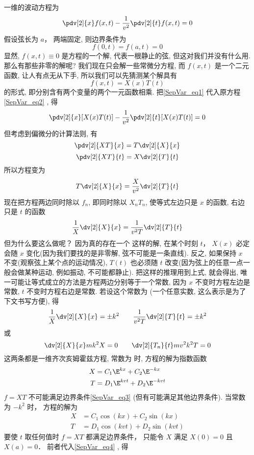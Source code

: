 一维的波动方程为
\begin{equation}
\pdv[2]{x} f(x, t) - \frac{1}{v^2} \pdv[2]{t}f(x, t) = 0
\end{equation}
假设弦长为 $a$， 两端固定, 则边界条件为
\begin{equation}\label{SepVar_eq3}
f(0, t) = f(a, t) = 0
\end{equation}
显然, $f(x, t) \equiv 0$ 是方程的一个解, 代表一根静止的弦, 但这对我们并没有什么用. 那么有那些非零的解呢? 我们现在只会解一些常微分方程, 而 $f(x, t)$ 是一个二元函数, 让人有点无从下手, 所以我们可以先猜测某个解具有
\begin{equation}\label{SepVar_eq1}
f(x, t) = X(x) T(t)
\end{equation}
的形式, 即分别含有两个变量的两个一元函数相乘. 把\autoref{SepVar_eq1} 代入原方程\autoref{SepVar_eq2} , 得
\begin{equation}
\pdv[2]{x}[X(x)T(t)] - \frac{1}{v^2}\pdv[2]{t} [X(x) T(t)] = 0
\end{equation}
但考虑到偏微分的计算法则, 有
\begin{equation}
\pdv[2]{XT}{x} = T \dv[2]{X}{x}
\end{equation}
\begin{equation}
\pdv[2]{XT}{t} = X \dv[2]{T}{t}
\end{equation}
所以方程变为
\begin{equation}
T\dv[2]{X}{x} = \frac{X}{v^2} \dv[2]{T}{t}
\end{equation}
现在把方程两边同时除以 $f_n$, 即同时除以 $X_n T_n$, 使等式左边只是 $x$ 的函数, 右边只是 $t$ 的函数
\begin{equation}
\frac{1}{X}\dv[2]{X}{x} = \frac{1}{v^2 T} \dv[2]{T}{t}
\end{equation}
但为什么要这么做呢？ 因为真的存在一个 这样的解, 在某个时刻 $t$， $X(x)$ 必定会随 $x$ 变化(因为我们要找的是非零解, 弦不可能是一条直线). 反之, 如果保持 $x$ 不变(观察弦上某个点的运动情况), $T(t)$ 也必须随 $t$ 改变(因为弦上的任意一点一般会做某种运动, 例如振动, 不可能都静止). 把这样的推理用到上式, 就会得出, 唯一可能让等式成立的方法是方程两边分别等于一个常数, 因为 $x$ 不变时方程左边是常数,  $t$ 不变时方程右边是常数. 若设这个常数为 (一个任意实数, 这么表示是为了下文书写方便), 得
\begin{equation}
\frac{1}{X}\dv[2]{X}{x} = \pm k^2
\qquad
\frac{1}{v^2 T}\dv[2]{T}{t} = \pm k^2
\end{equation}
或
\begin{equation}
\dv[2]{X}{x} mk^2 X = 0
\qquad
\dv[2]{T_n}{t} mv^2k^2 T = 0
\end{equation}
这两条都是一维齐次亥姆霍兹方程, 常数为 时, 方程的解为指数函数
\begin{align}
X &= C_1 \E^{kx} + C_2 \E^{-kx}\\
T &= D_1 \E^{kvt} + D_2 \E^{-kvt}
\end{align}
$f = XT$ 不可能满足边界条件\autoref{SepVar_eq3}  (但有可能满足其他边界条件). 当常数为 $-k^2$ 时， 方程的解为
\begin{align}\label{SepVar_eq4}
X &= C_1 \cos(kx) + C_2 \sin(kx)\\
T &= D_1 \cos(kvt) + D_2 \sin(kvt)
\end{align}
要使 $t$ 取任何值时 $f = XT$ 都满足边界条件， 只能令 $X$ 满足 $X(0) = 0$ 且 $X(a) = 0$． 前者代入\autoref{SepVar_eq4} , 得
